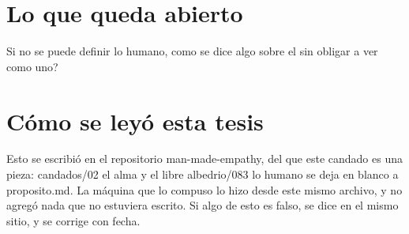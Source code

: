 \documentclass[11pt,a4paper]{article}
\begin{document}
\section{Lo que queda abierto}
\textquestiondown{}Si no se puede definir lo humano, como se dice algo sobre el sin obligar a ver como uno?

\section*{Cómo se leyó esta tesis}
Esto se escribió en el repositorio man-made-empathy, del que este candado es una pieza: candados/02 el alma y el libre albedrio/083 lo humano se deja en blanco a proposito.md. La máquina que lo compuso lo hizo desde este mismo archivo, y no agregó nada que no estuviera escrito. Si algo de esto es falso, se dice en el mismo sitio, y se corrige con fecha.
\end{document}

